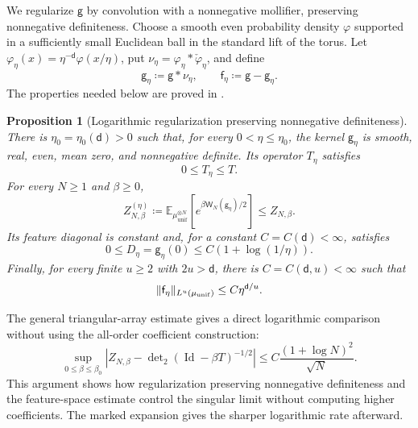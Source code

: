 \documentclass[11pt,reqno]{amsart}
\numberwithin{equation}{section}
\theoremstyle{plain}
\newtheorem{prop}[prop]{Proposition}
\theoremstyle{definition}
\DeclarePairedDelimiter{\norm}{\lVert}{\rVert}
\renewcommand{\d}{\mathsf d}
\newcommand{\E}{\mathbb E}
\newcommand{\Id}{\operatorname{Id}}
\newcommand{\be}{\beta}
\newcommand{\g}{\mathsf g}
\newcommand{\f}{\mathsf f}
\newcommand{\muunif}{\mu_{\mathrm{unif}}}
\begin{document}
We regularize $\g$ by convolution with a nonnegative mollifier, preserving nonnegative definiteness.  Choose a smooth even probability density $\varphi$ supported in a sufficiently small Euclidean ball in the standard lift of the torus.  Let $\varphi_\eta(x)=\eta^{-\d}\varphi(x/\eta)$, put $\nu_\eta=\varphi_\eta*\check\varphi_\eta$, and define
\begin{equation}
 \g_{\eta}\coloneqq\g*\nu_\eta,
 \qquad
 \f_{\eta}\coloneqq\g-\g_{\eta}.
 \label{eq:positive-logarithmic-regularization}
\end{equation}
The properties needed below are proved in .

\begin{prop}[Logarithmic regularization preserving nonnegative definiteness]
\label{prop:positive-logarithmic-regularization}
There is $\eta_0=\eta_0(\d)>0$ such that, for every $0<\eta\leq\eta_0$, the kernel $\g_{\eta}$ is smooth, real, even, mean zero, and nonnegative definite.  Its operator $T_{\eta}$ satisfies
\begin{equation}
 0\leq T_{\eta}\leq T.
 \label{eq:regularized-operator-order}
\end{equation}
For every $N\geq1$ and $\be\geq0$,
\begin{equation}
 Z_{N,\be}^{(\eta)}
 \coloneqq\E_{\muunif^{\otimes N}}\left[e^{\be\mathsf W_N(\g_{\eta})/2}\right]
 \leq Z_{N,\be}.
 \label{eq:regularized-partition-domination}
\end{equation}
Its feature diagonal is constant and, for a constant $C=C(\d)<\infty$, satisfies
\begin{equation}
 0\leq D_{\eta}=\g_{\eta}(0)
 \leq C(1+\log(1/\eta)).
 \label{eq:regularized-feature-diagonal}
\end{equation}
Finally, for every finite $u\geq2$ with $2u>\d$, there is $C=C(\d,u)<\infty$ such that
\begin{equation}
 \norm{\f_{\eta}}_{L^u(\muunif)}
 \leq C\eta^{\d/u}.
 \label{eq:regularization-Lu-rate}
\end{equation}
\end{prop}

The general triangular-array estimate gives a direct logarithmic comparison without using the all-order coefficient construction:
\begin{equation}
 \sup_{0\leq\be\leq\be_0}
 \left|Z_{N,\be}-\det\nolimits_2(\Id-\be T)^{-1/2}\right|
 \leq C\frac{(1+\log N)^2}{\sqrt N}.
 \label{eq:homogeneous-direct-rate}
\end{equation}
This argument shows how regularization preserving nonnegative definiteness and the feature-space estimate control the singular limit without computing higher coefficients. The marked expansion gives the sharper logarithmic rate afterward.
\end{document}
